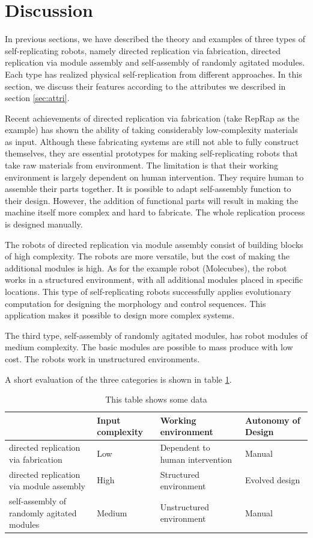 \documentclass[12pt,twoside]{article}
\theoremstyle{plain}
\theoremstyle{definition}
\theoremstyle{remark}
\begin{document}
\section{Discussion}
\label{sec:discuss}

In previous sections, we have described the theory and examples of three types of self-replicating robots, namely directed replication via fabrication, directed replication via module assembly and self-assembly of randomly agitated modules. Each type has realized physical self-replication from different approaches. In this section, we discuss their features according to the attributes we described in section \ref{sec:attri}.

Recent achievements of directed replication via fabrication (take RepRap as the example) has shown the ability of taking considerably low-complexity materials as input. Although these fabricating systems are still not able to fully construct themselves, they are essential prototypes for making self-replicating robots that take raw materials from environment. The limitation is that their working environment is largely dependent on human intervention. They require human to assemble their parts together. It is possible to adapt self-assembly function to their design. However, the addition of functional parts will result in making the machine itself more complex and hard to fabricate. The whole replication process is designed manually.

The robots of directed replication via module assembly consist of building blocks of high complexity. The robots are more versatile, but the cost of making the additional modules is high. As for the example robot (Molecubes), the robot works in a structured environment, with all additional modules placed in specific locations. This type of self-replicating robots successfully applies evolutionary computation for designing the morphology and control sequences. This application makes it possible to design more complex systems.

The third type, self-assembly of randomly agitated modules, has robot modules of medium complexity. The basic modules are possible to mass produce with low cost. The robots work in unstructured environments.

A short evaluation of the three categories is shown in table \ref{tab:eval}.

\begin{table}[ht]
  \centering
  \caption{This table shows some data}
  \label{tab:eval}
  \begin{tabular}{|p{4.3cm}|p{2cm}|p{4cm}|p{2.9cm}|}
    \hline 
    ~ & Input complexity & Working environment & Autonomy of Design \\
    \hline \hline
    directed replication via fabrication & Low & Dependent to human intervention & Manual \\
    \hline
    directed replication via module assembly & High & Structured environment & Evolved design \\
    \hline
    self-assembly of randomly agitated modules & Medium & Unstructured environment & Manual \\
    \hline
  \end{tabular}
\end{table}
\end{document}
